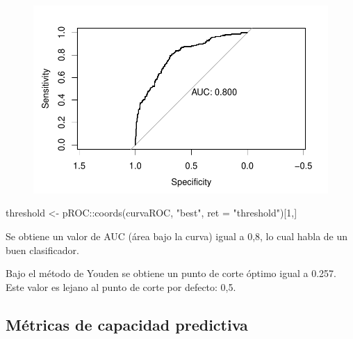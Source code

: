 \documentclass[
  letterpaper,
  DIV=11,
  numbers=noendperiod]{scrartcl}
\newenvironment{Shaded}{\begin{snugshade}}{\end{snugshade}}
\newcommand{\AttributeTok}[1]{\textcolor[rgb]{0.40,0.45,0.13}{#1}}
\newcommand{\DecValTok}[1]{\textcolor[rgb]{0.68,0.00,0.00}{#1}}
\newcommand{\FunctionTok}[1]{\textcolor[rgb]{0.28,0.35,0.67}{#1}}
\newcommand{\NormalTok}[1]{\textcolor[rgb]{0.00,0.23,0.31}{#1}}
\newcommand{\OtherTok}[1]{\textcolor[rgb]{0.00,0.23,0.31}{#1}}
\newcommand{\SpecialCharTok}[1]{\textcolor[rgb]{0.37,0.37,0.37}{#1}}
\newcommand{\StringTok}[1]{\textcolor[rgb]{0.13,0.47,0.30}{#1}}
\begin{document}
\begin{figure}[H]

{\centering \includegraphics{TP_final_files/figure-pdf/unnamed-chunk-45-1.pdf}

}

\end{figure}

\begin{Shaded}
\begin{Highlighting}[]
\NormalTok{threshold }\OtherTok{\textless{}{-}}\NormalTok{ pROC}\SpecialCharTok{::}\FunctionTok{coords}\NormalTok{(curvaROC, }\StringTok{"best"}\NormalTok{, }\AttributeTok{ret =} \StringTok{"threshold"}\NormalTok{)[}\DecValTok{1}\NormalTok{,]}
\end{Highlighting}
\end{Shaded}

Se obtiene un valor de AUC (área bajo la curva) igual a 0,8, lo cual
habla de un buen clasificador.

Bajo el método de Youden se obtiene un punto de corte óptimo igual a
0.257. Este valor es lejano al punto de corte por defecto: 0,5.

\hypertarget{muxe9tricas-de-capacidad-predictiva}{%
\subsection{Métricas de capacidad
predictiva}\label{muxe9tricas-de-capacidad-predictiva}}
\end{document}
